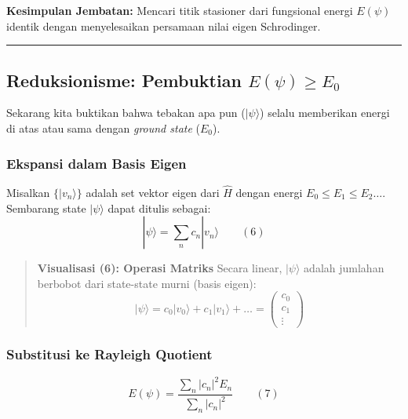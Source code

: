 \textbf{Kesimpulan Jembatan:} Mencari titik stasioner dari fungsional energi \(E(\psi)\) identik dengan menyelesaikan persamaan nilai eigen Schrodinger.

\begin{center}\rule{0.5\linewidth}{0.5pt}\end{center}

\hypertarget{reduksionisme-pembuktian-epsi-ge-e_0}{%
\subsection{\texorpdfstring{Reduksionisme: Pembuktian \(E(\psi) \ge E_0\)}{Reduksionisme: Pembuktian E(\textbackslash psi) \textbackslash ge E\_0}}\label{reduksionisme-pembuktian-epsi-ge-e_0}}

Sekarang kita buktikan bahwa tebakan apa pun (\(|\psi\rangle\)) selalu memberikan energi di atas atau sama dengan \emph{ground state} (\(E_0\)).

\hypertarget{a.-ekspansi-dalam-basis-eigen}{%
\subsubsection{Ekspansi dalam Basis Eigen}\label{a.-ekspansi-dalam-basis-eigen}}

Misalkan \(\{|v_n\rangle\}\) adalah set vektor eigen dari \(\hat{H}\) dengan energi \(E_0 \le E_1 \le E_2 \dots\). Sembarang state \(|\psi\rangle\) dapat ditulis sebagai: \[ |\psi\rangle = \sum_n c_n |v_n\rangle \qquad (6) \]

\begin{quote}
\textbf{Visualisasi (6): Operasi Matriks} Secara linear, \(|\psi\rangle\) adalah jumlahan berbobot dari state-state murni (basis eigen): \[ |\psi\rangle = c_0 |v_0\rangle + c_1 |v_1\rangle + \dots = \begin{pmatrix} c_0 \\ c_1 \\ \vdots \end{pmatrix} \]
\end{quote}

\hypertarget{b.-substitusi-ke-rayleigh-quotient}{%
\subsubsection{Substitusi ke Rayleigh Quotient}\label{b.-substitusi-ke-rayleigh-quotient}}

\[ E(\psi) = \frac{\sum_n |c_n|^2 E_n}{\sum_n |c_n|^2} \qquad (7) \]

